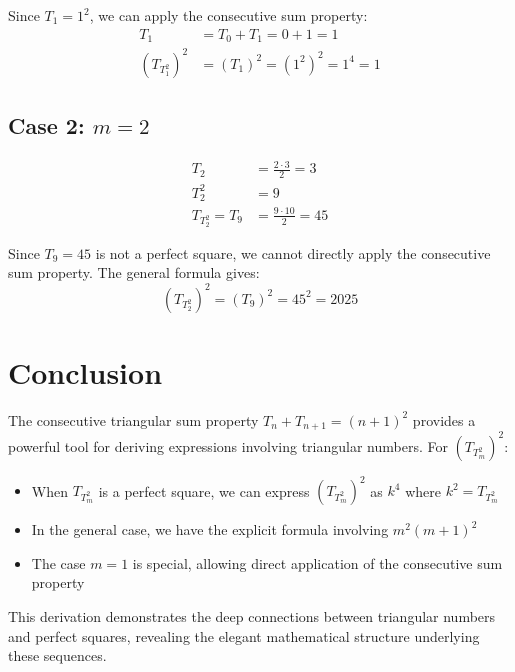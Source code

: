 \documentclass{article}
\begin{document}
Since $T_1 = 1^2$, we can apply the consecutive sum property:
\begin{align}
T_1 &= T_0 + T_1 = 0 + 1 = 1 \\
(T_{T_1^2})^2 &= (T_1)^2 = (1^2)^2 = 1^4 = 1
\end{align}

\subsection{Case 2: $m = 2$}

\begin{align}
T_2 &= \frac{2 \cdot 3}{2} = 3 \\
T_2^2 &= 9 \\
T_{T_2^2} = T_9 &= \frac{9 \cdot 10}{2} = 45
\end{align}

Since $T_9 = 45$ is not a perfect square, we cannot directly apply the consecutive sum property. The general formula gives:
\begin{equation}
(T_{T_2^2})^2 = (T_9)^2 = 45^2 = 2025
\end{equation}

\section{Conclusion}

The consecutive triangular sum property $T_n + T_{n+1} = (n+1)^2$ provides a powerful tool for deriving expressions involving triangular numbers. For $(T_{T_m^2})^2$:

\begin{itemize}
\item When $T_{T_m^2}$ is a perfect square, we can express $(T_{T_m^2})^2$ as $k^4$ where $k^2 = T_{T_m^2}$
\item In the general case, we have the explicit formula involving $m^2(m+1)^2$
\item The case $m = 1$ is special, allowing direct application of the consecutive sum property
\end{itemize}

This derivation demonstrates the deep connections between triangular numbers and perfect squares, revealing the elegant mathematical structure underlying these sequences.
\end{document}
